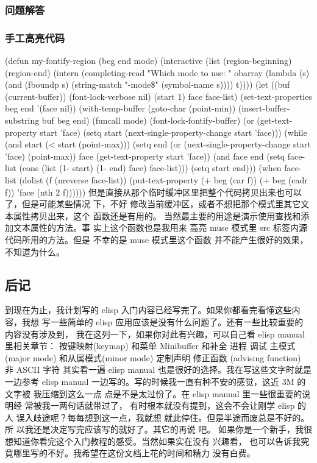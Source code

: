 \documentclass[11pt]{ctexart}
\begin{document}
{{{{\subsubsection{问题解答}
\label{sec:orgbb15e8a}
\subsubsection{手工高亮代码}
\label{sec:orge31dc6f}
(defun my-fontify-region (beg end mode)
(interactive
(list (region-beginning)
(region-end)
(intern
(completing-read "Which mode to use: "
obarray (lambda (s)
(and (fboundp s)
(string-match "-mode\$" (symbol-name s))))
t))))
(let ((buf (current-buffer))
(font-lock-verbose nil)
(start 1) face face-list)
(set-text-properties beg end '(face nil))
(with-temp-buffer
(goto-char (point-min))
(insert-buffer-substring buf beg end)
(funcall mode)
(font-lock-fontify-buffer)
(or (get-text-property start 'face)
(setq start (next-single-property-change start 'face)))
(while (and start (< start (point-max)))
(setq end (or (next-single-property-change start 'face)
(point-max))
face (get-text-property start 'face))
(and face end (setq face-list (cons (list (1- start) (1- end) face) face-list)))
(setq start end)))
(when face-list
(dolist (f (nreverse face-list))
(put-text-property (+ beg (car f)) (+ beg (cadr f))
'face (nth 2 f))))))
但是直接从那个临时缓冲区里把整个代码拷贝出来也可以了，但是可能某些情况 下，不好
修改当前缓冲区，或者不想把那个模式里其它文本属性拷贝出来，这个 函数还是有用的。
当然最主要的用途是演示使用查找和添加文本属性的方法。事 实上这个函数也是我用来
高亮 muse 模式里 src 标签内源代码所用的方法。但是 不幸的是 muse 模式里这个函数
并不能产生很好的效果，不知道为什么。

\subsection{后记}
\label{sec:org267fde0}

到现在为止，我计划写的 elisp 入门内容已经写完了。如果你都看完看懂这些内 容，我想
写一些简单的 elisp 应用应该是没有什么问题了。还有一些比较重要的 内容没有涉及到，
我在这列一下，如果你对此有兴趣，可以自己看 elisp manual 里相关章节：
按键映射(keymap) 和菜单
Minibuffer 和补全
进程
调试
主模式(major mode) 和从属模式(minor mode)
定制声明
修正函数 (advising function)
非 ASCII 字符
其实看一遍 elisp manual 也是很好的选择。我在写这些文字时就是一边参考 elisp
manual 一边写的。写的时候我一直有种不安的感觉，这近 3M 的文字被 我压缩到这么一点
点是不是太过份了。在 elisp manual 里一些很重要的说明经 常被我一两句话就带过了，
有时根本就没有提到，这会不会让刚学 elisp 的人 误入歧途呢？每每想到这一点，我就想
就此停住。但是半途而废总是不好的。所 以我还是决定写完应该写的就好了。其它的再说
吧。
如果你是一个新手，我很想知道你看完这个入门教程的感受。当然如果实在没有 兴趣看，
也可以告诉我究竟哪里写的不好。我希望在这份文档上花的时间和精力 没有白费。
}}}}
\end{document}

